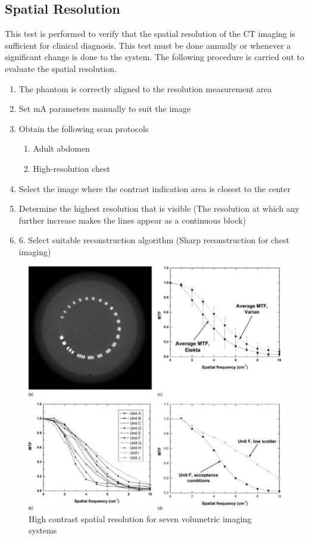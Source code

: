 \documentclass[12pt]{article}
\begin{document}
\subsection{Spatial Resolution}
This test is performed to verify that the spatial resolution of the CT imaging is sufficient for clinical diagnosis. This test must be done annually or whenever a significant change is done to the system. The following procedure is carried out to evaluate the spatial resolution. 
\begin{enumerate}
    \item The phantom is correctly aligned to the resolution measurement area
    \item Set mA parameters manually to suit the image
    \item Obtain the following scan protocols
    \begin{enumerate}
        \item Adult abdomen
        \item High-resolution chest
    \end{enumerate}
    
    \item Select the image where the contrast indication area is closest to the center
    \item Determine the highest resolution that is visible
(The resolution at which any further increase makes the lines appear as a continuous block)
    \item 6. Select suitable reconstruction algorithm (Sharp reconstruction for chest imaging)
\end{enumerate}

\begin{figure}[h!]
  \centering
  \includegraphics[width=0.55\linewidth]{sr.png}
  \caption{\small{High contrast spatial resolution for seven volumetric imaging systems}}
  \label{fig:High contrast spatial resolution for seven volumetric imaging systems}
\end{figure}
\end{document}
